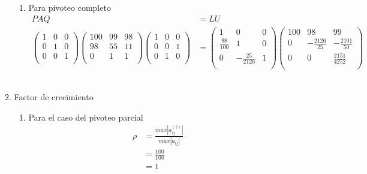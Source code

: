 \begin{enumerate}[]
\begin{enumerate}[]
\begin{enumerate}[]
            \item Para pivoteo completo
            \begin{align*}
                PAQ &= LU\\
                \begin{pmatrix}
                1 & 0 & 0 \\ 
                0 & 1 & 0 \\
                0 & 0 & 1 \\
                \end{pmatrix}
                \begin{pmatrix}
                100 & 99 & 98 \\ 
                98 & 55 & 11 \\
                0 & 1 & 1 \\
                \end{pmatrix}
                \begin{pmatrix}
                1 & 0 & 0 \\ 
                0 & 0 & 1 \\
                0 & 1 & 0 \\
                \end{pmatrix} &= 
                \begin{pmatrix}
                1 & 0 & 0 \\ 
                \frac{98}{100} & 1 & 0 \\
                0 & -\frac{25}{2126} & 1 \\
                \end{pmatrix}
                \begin{pmatrix}
                100 & 98 & 99 \\ 
                0 & -\frac{2126}{25} & -\frac{2101}{50} \\
                0 & 0 & \frac{2151}{4252} \\
                \end{pmatrix}
            \end{align*}
            \\
        \end{enumerate}
        
        \item Factor de crecimiento
        \begin{enumerate}[]
            \item Para el caso del pivoteo parcial
            \begin{align*}
                \rho &=  \frac{max |a_{ij}^{(2)}|}{max |a_{ij}|}\\
                &=  \frac{100}{100}\\
                &=  1\\
            \end{align*}
            

\end{enumerate}
\end{enumerate}
\end{enumerate}
